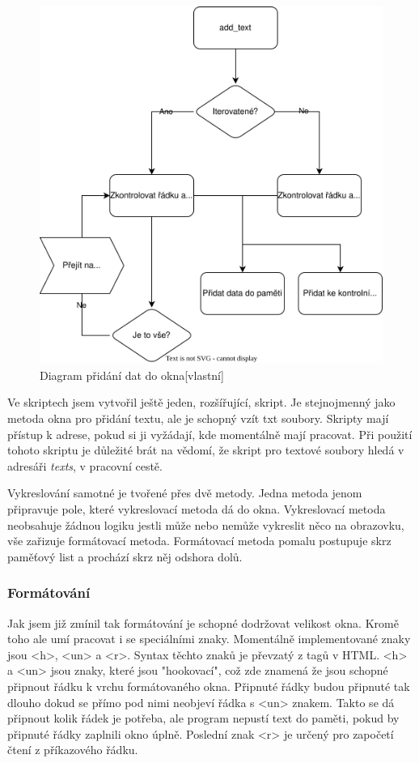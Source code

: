 \documentclass[12pt,a4paper]{article}
\begin{document}
\begin{figure}[H]
    \centering
    \includegraphics[width=\textwidth-3 cm]{pictures/logic-window.drawio.svg}
    \caption{Diagram přidání dat do okna[vlastní]}
\end{figure}

Ve skriptech jsem vytvořil ještě jeden, rozšířující, skript. Je stejnojmenný jako metoda okna pro přidání textu, ale je schopný vzít txt soubory. Skripty mají přístup k adrese, pokud si ji vyžádají, kde momentálně mají pracovat. Při použití tohoto skriptu je důležité brát na vědomí, že skript pro textové soubory hledá v adresáři \textit{texts}, v pracovní cestě.

Vykreslování samotné je tvořené přes dvě metody. Jedna metoda jenom připravuje pole, které vykreslovací metoda dá do okna. Vykreslovací metoda neobsahuje žádnou logiku jestli může nebo nemůže vykreslit něco na obrazovku, vše zařizuje formátovací metoda.
Formátovací metoda pomalu postupuje skrz paměťový list a prochází skrz něj odshora dolů.
\subsubsection{Formátování}
Jak jsem již zmínil tak formátování je schopné dodržovat velikost okna. Kromě toho ale umí pracovat i se speciálními znaky. Momentálně implementované znaky jsou <h>, <un> a <r>. Syntax těchto znaků je převzatý z tagů v HTML. <h> a <un> jsou znaky, které jsou "hookovací", což zde znamená že jsou schopné připnout řádku k vrchu formátovaného okna. Připnuté řádky budou připnuté tak dlouho dokud se přímo pod nimi neobjeví řádka s <un> znakem. Takto se dá připnout kolik řádek je potřeba, ale program nepustí text do paměti, pokud by připnuté řádky zaplnili okno úplně. Poslední znak <r> je určený pro započetí čtení z příkazového řádku.
\end{document}
